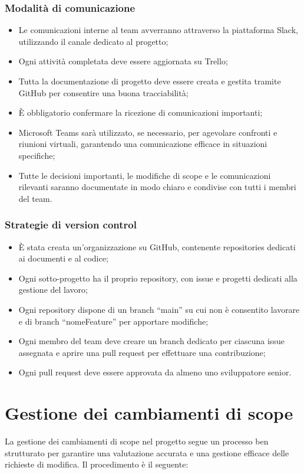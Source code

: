 \documentclass[a4paper,12pt, openright]{report}
\begin{document}
\subsubsection{Modalità di comunicazione}
\begin{itemize}
    \item Le comunicazioni interne al team avverranno attraverso la piattaforma Slack, utilizzando il canale dedicato al progetto;
    \item Ogni attività completata deve essere aggiornata su Trello;
    \item Tutta la documentazione di progetto deve essere creata e gestita tramite GitHub per consentire una buona tracciabilità;
    \item È obbligatorio confermare la ricezione di comunicazioni importanti;
    \item Microsoft Teams sarà utilizzato, se necessario, per agevolare confronti e riunioni virtuali, garantendo una comunicazione efficace in situazioni specifiche;
    \item Tutte le decisioni importanti, le modifiche di scope e le comunicazioni rilevanti saranno documentate in modo chiaro e condivise con tutti i membri del team.
\end{itemize}

\subsubsection{Strategie di version control}
\begin{itemize}
    \item È stata creata un'organizzazione su GitHub, contenente repositories dedicati ai documenti e al codice;
    \item Ogni sotto-progetto ha il proprio repository, con issue e progetti dedicati alla gestione del lavoro;
    \item Ogni repository dispone di un branch ``main'' su cui non è consentito lavorare e di branch ``nomeFeature'' per apportare modifiche;
    \item Ogni membro del team deve creare un branch dedicato per ciascuna issue assegnata e aprire una pull request per effettuare una contribuzione;
    \item Ogni pull request deve essere approvata da almeno uno sviluppatore senior.
\end{itemize}

\section{Gestione dei cambiamenti di scope}
La gestione dei cambiamenti di scope nel progetto segue un processo ben strutturato per garantire una valutazione accurata e una gestione efficace delle richieste di modifica. Il procedimento è il seguente:
\end{document}

